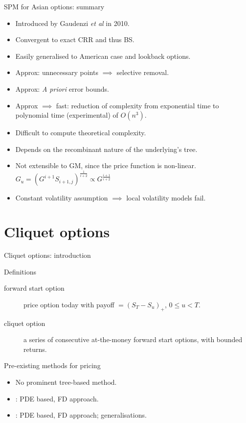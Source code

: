 \documentclass[utf8,t,compress,xcolor=svgnames,handout]{beamer}
\newcommand\pro{\item[\textbf{\CheckedBox}]}
\newcommand\con{\item[\textbf{\XBox}]}
\newcommand\neu{\item[\textbf{\Square}]}
\begin{document}
	
	\begin{frame}{SPM for Asian options: summary}
		\begin{itemize}
			\neu Introduced by Gaudenzi \emph{et al} \cite{Gaudenzi2010} in 2010.
			\pro Convergent to exact CRR and thus BS.
			\pro Easily generalised to American case and lookback options.
			\pro Approx: unnecessary points $ \implies $ selective removal.
			\pro Approx: \emph{A priori} error bounds.
			\pro Approx $ \implies $ fast: reduction of complexity from exponential time to polynomial time (experimental) of $ O(n^3) $.
			\con Difficult to compute theoretical complexity.
			\con Depends on the recombinant nature of the underlying's tree.
			\con<alert@1-> Not extensible to GM, since the price function is non-linear. $ G_u = \left( G^{i+1} S_{i+1,j} \right)^{\frac{1}{i+2}} \propto G^{\frac{i+1}{i+2}} $
			\con<alert@1-> Constant volatility assumption $ \implies $ local volatility models fail.
		\end{itemize}
	\end{frame}
	
	
	
	\section{Cliquet options}
	
	\begin{frame}{Cliquet options: introduction}
		\begin{block}{Definitions}
			\begin{description}
				\item[forward start option] price option today with payoff $ = (S_T - S_u)_+ $, $ 0 \le u < T $.
				\item[cliquet option] a series of consecutive at-the-money forward start options, with bounded returns.
			\end{description}
		\end{block}
		\begin{block}{Pre-existing methods for pricing}
			\begin{itemize}
				\item No prominent tree-based method.
				\item \cite{Wilmott2002}: PDE based, FD approach.
				\item \cite{Windcliff2006}: PDE based, FD approach; generalisations.
			\end{itemize}
		\end{block}
	\end{frame}
	
\end{document}
